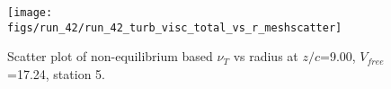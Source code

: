\begin{figure}[H]
\centering
\texttt{[image: figs/run\_42/run\_42\_turb\_visc\_total\_vs\_r\_meshscatter]}
\caption{Scatter plot of non-equilibrium based $\nu_T$ vs radius at $z/c$=9.00, $V_{free}$=17.24, station 5.}
\label{fig:run_42_turb_visc_total_vs_r_meshscatter}
\end{figure}



